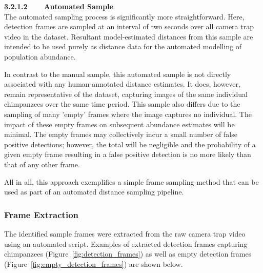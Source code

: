 \vspace{3mm}

\textbf{3.2.1.2~~~~Automated Sample}\vspace{4.5mm}\\
The automated sampling process is significantly more straightforward.
Here, detection frames are sampled at an interval of two seconds over all camera trap video in
the dataset.
Resultant model-estimated distances from this sample are intended to be used purely as distance
data for the automated modelling of population abundance.

In contrast to the manual sample, this automated sample is not directly associated with any
human-annotated distance estimates.
It does, however, remain representative of the dataset, capturing images of the same individual
chimpanzees over the same time period.
This sample also differs due to the sampling of many 'empty' frames where the image captures no
individual.
The impact of these empty frames on subsequent abundance estimates will be minimal.
The empty frames may collectively incur a small number of false positive detections; however,
the total will be negligible and the probability of a given empty frame resulting in a false
positive detection is no more likely than that of any other frame.

All in all, this approach exemplifies a simple frame sampling method that can be used as part of
an automated distance sampling pipeline.

\vspace{-2.5mm}

\subsubsection{Frame Extraction}
The identified sample frames were extracted from the raw camera trap video using an automated
script.
Examples of extracted detection frames capturing chimpanzees (Figure~\ref{fig:detection_frames})
as well as empty detection frames (Figure~\ref{fig:empty_detection_frames}) are shown below.

\vspace{1cm}

